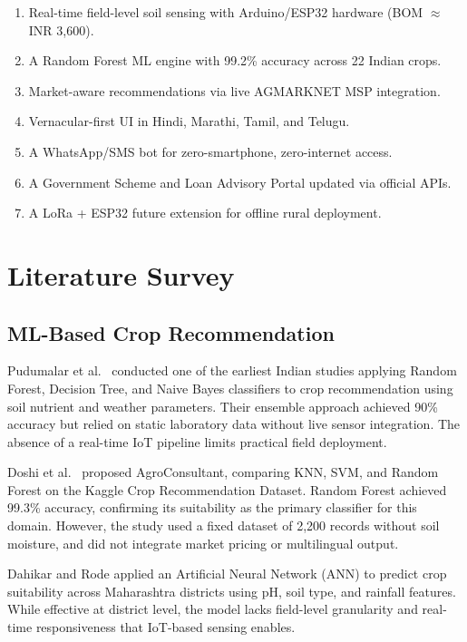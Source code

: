 \documentclass[10pt,twocolumn]{article}
\begin{document}
\begin{enumerate}[leftmargin=1.4em, itemsep=2pt]
    \item Real-time field-level soil sensing with Arduino/ESP32 hardware (BOM $\approx$ INR 3,600).
    \item A Random Forest ML engine with 99.2\% accuracy across 22 Indian crops.
    \item Market-aware recommendations via live AGMARKNET MSP integration.
    \item Vernacular-first UI in Hindi, Marathi, Tamil, and Telugu.
    \item A WhatsApp/SMS bot for zero-smartphone, zero-internet access.
    \item A Government Scheme and Loan Advisory Portal updated via official APIs.
    \item A LoRa + ESP32 future extension for offline rural deployment.
\end{enumerate}

\section{Literature Survey}

\subsection{ML-Based Crop Recommendation}

Pudumalar et al.\ \cite{pudumalar2017} conducted one of the earliest Indian studies applying Random Forest, Decision Tree, and Naive Bayes classifiers to crop recommendation using soil nutrient and weather parameters. Their ensemble approach achieved 90\% accuracy but relied on static laboratory data without live sensor integration. The absence of a real-time IoT pipeline limits practical field deployment.

Doshi et al.\ \cite{doshi2018} proposed AgroConsultant, comparing KNN, SVM, and Random Forest on the Kaggle Crop Recommendation Dataset. Random Forest achieved 99.3\% accuracy, confirming its suitability as the primary classifier for this domain. However, the study used a fixed dataset of 2,200 records without soil moisture, and did not integrate market pricing or multilingual output.

Dahikar and Rode \cite{dahikar2014} applied an Artificial Neural Network (ANN) to predict crop suitability across Maharashtra districts using pH, soil type, and rainfall features. While effective at district level, the model lacks field-level granularity and real-time responsiveness that IoT-based sensing enables.
\end{document}
